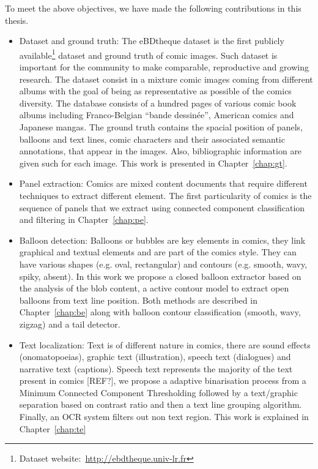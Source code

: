 To meet the above objectives, we have made the following contributions in this
thesis.

\begin{itemize}
	\item[1)] Dataset and ground truth: The eBDtheque dataset is the first publicly available\footnote{Dataset website:~\url{http://ebdtheque.univ-lr.fr}} dataset and ground truth of comic images.
	Such dataset is important for the community to make comparable, reproductive and growing research.
	The dataset consist in a mixture comic images coming from different albums with the goal of being as representative as possible of the comics diversity.
	The database consists of a hundred pages of various comic book albums including Franco-Belgian ``bande dessinée'', American comics and Japanese mangas. 
	The ground truth contains the spacial position of panels, balloons and text lines, comic characters and their associated semantic annotations, that appear in the images.
	Also, bibliographic information are given such for each image.
	This work is presented in Chapter~\ref{chap:gt}.
	
	\item [2)] Panel extraction: Comics are mixed content documents that require different techniques to extract different element.
	The first particularity of comics is the sequence of panels that we extract using connected component classification and filtering in Chapter~\ref{chap:pe}.
	
	\item [3)] Balloon detection: Balloons or bubbles are key elements in comics,
	they link graphical and textual elements and are part of the comics style. They can have various shapes (e.g. oval, rectangular) and contours (e.g. smooth, wavy, spiky, absent).
	In this work we propose a closed balloon extractor based on the analysis of the blob content, a active contour model to extract open balloons from text line position.
	Both methods are described in Chapter~\ref{chap:be} along with balloon contour classification (smooth, wavy, zigzag) and a tail detector.

	\item [4)] Text localization: Text is of different nature in comics, there are sound effects (onomatopoeias), graphic text (illustration), speech text (dialogues) and narrative text (captions). 
	Speech text represents the majority of the text present in comics [REF?], we propose a adaptive binarisation process from a Minimum Connected Component Thresholding followed by a text/graphic separation based on contrast ratio and then a text line grouping algorithm.
	Finally, an OCR system filters out non text region.
	This work is explained in Chapter~\ref{chap:te}


\end{itemize}
